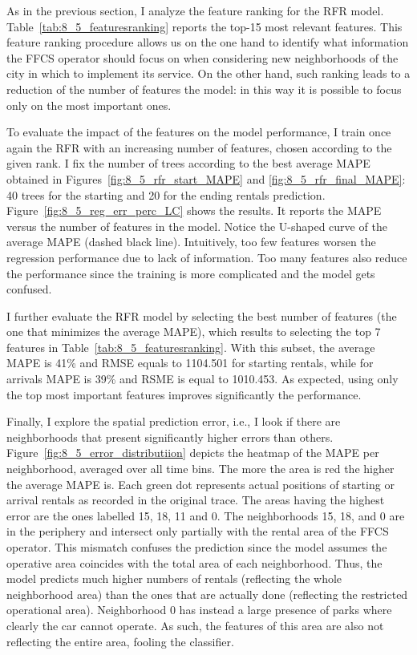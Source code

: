 As in the previous section, I analyze the feature ranking for the RFR model. 
Table~\ref{tab:8_5_featuresranking} reports the top-15 most relevant features. 
This feature ranking procedure allows us on the one hand to identify what information the FFCS operator should focus on when considering new neighborhoods of the city in which to implement its service. 
On the other hand, such ranking leads to a reduction of the number of features the model: in this way it is possible to focus only on the most important ones.

To evaluate the impact of the features on the model performance, I train once again the RFR with an increasing number of features, chosen according to the given rank. I fix the number of trees according to the best average MAPE obtained in Figures~\ref{fig:8_5_rfr_start_MAPE} and \ref{fig:8_5_rfr_final_MAPE}: 40 trees for the starting and 20 for the ending rentals prediction. Figure~\ref{fig:8_5_reg_err_perc_LC} shows the results. It reports the MAPE versus the number of features in the model.
Notice the U-shaped curve of the average MAPE (dashed black line). Intuitively, too few features worsen the regression performance due to lack of information. Too many features also reduce the performance since the training is more complicated and the model gets confused.

I further evaluate the RFR model by selecting the best number of features (the one that minimizes the average MAPE), which results to selecting the top 7 features in Table~\ref{tab:8_5_featuresranking}. With this subset, the average MAPE is 41\% and RMSE equals to 1104.501 for starting rentals, while for arrivals
MAPE is 39\% and  RSME is equal to 1010.453. 
As expected, using only the top most important features improves significantly the performance.

Finally, I explore the spatial prediction error, i.e., I look if there are neighborhoods that present significantly higher errors than others.
Figure~\ref{fig:8_5_error_distributiion} depicts the heatmap of the MAPE per neighborhood, averaged over all time bins. The more the area is red the higher the average MAPE is. Each green dot represents actual positions of starting or arrival rentals as recorded in the original trace.
The areas having the highest error are the ones labelled 15, 18, 11 and 0. The neighborhoods 15, 18, and 0 are in the periphery and intersect only partially with the rental area of the FFCS operator. This mismatch confuses the prediction since the model assumes the operative area coincides with the total area of each neighborhood. Thus, the model predicts much higher numbers of rentals (reflecting the whole neighborhood area) than the ones that are actually done (reflecting the restricted operational area). Neighborhood 0 has instead a large presence of parks where clearly the car cannot operate. As such, the features of this area are also not reflecting the entire area, fooling the classifier.

